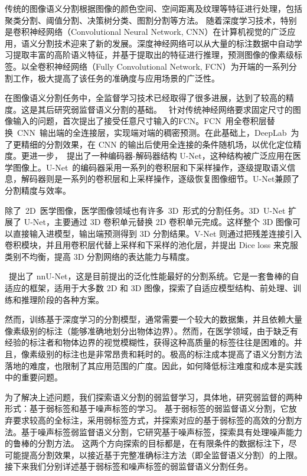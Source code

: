 传统的图像语义分割根据图像的颜色空间、空间距离及纹理等特征进行处理，包括聚类分割\citep{coates2012learning}、阈值分割\citep{ying2005fast}、决策树分类\citep{shotton2008semantic}、图割分割\citep{vicente2008graph}等方法。
随着深度学习技术，特别是卷积神经网络（Convolutional Neural Network, CNN）在计算机视觉的广泛应用，语义分割技术迎来了新的发展。深度神经网络可以从大量的标注数据中自动学习提取丰富的高阶语义特征，并基于提取出的特征进行推理，预测图像的像素级标签。以全卷积神经网络（Fully Convolutional Network, FCN）为开端的一系列分割工作，极大提高了该任务的准确度与应用场景的广泛性。

在图像语义分割任务中，全监督学习技术已经取得了很多进展，达到了较高的精度。这是其后研究弱监督语义分割的基础。
\citet{long2015fully}~针对传统神经网络要求固定尺寸的图像输入的问题，首次提出了接受任意尺寸输入的FCN。FCN~用全卷积层替换~CNN~输出端的全连接层，实现端对端的稠密预测。在此基础上，DeepLab~为了更精细的分割效果，在 CNN 的输出后使用全连接的条件随机场，以优化定位精度。更进一步，\citet{ronneberger2015u}~提出了一种编码器-解码器结构 U-Net，这种结构被广泛应用在医学图像上。U-Net~的编码器采用一系列的卷积层和下采样操作，逐级提取语义信息，解码器则是一系列的卷积层和上采样操作，逐级恢复图像细节。U-Net兼顾了分割精度与效率。

除了~2D~医学图像，医学图像领域也有许多~3D~形式的分割任务。3D~U-Net 扩展了 U-Net，主要通过 3D 卷积单元替换 2D 卷积单元完成。这样整个 3D 图像可以直接输入进模型，输出端预测得到 3D 分割结果。V-Net 则通过把残差连接引入卷积模块，并且用卷积层代替上采样和下采样的池化层，并提出 Dice loss 来克服类别不均衡，提高 3D 分割网络的表达能力与精度。

\citet{isensee2019automated}~提出了 nnU-Net，这是目前提出的泛化性能最好的分割系统。它是一套鲁棒的自适应的框架，适用于大多数 2D 和 3D 图像，探索了自适应模型结构、前处理、训练和推理阶段的各种方案。

然而，训练基于深度学习的分割模型，通常需要一个较大的数据集，并且依赖大量像素级别的标注（能够准确地划分出物体边界）。然而，在医学领域，由于缺乏有经验的标注者和物体边界的视觉模糊性，获得这种高质量的标签往往是困难的。并且，像素级别的标注也是非常昂贵和耗时的。极高的标注成本提高了语义分割方法落地的难度，也限制了其应用范围的广度。因此，如何降低标注难度和成本是实践中的重要问题。

为了解决上述问题，我们探索语义分割的弱监督学习，具体地，研究弱监督的两种形式：基于弱标签和基于噪声标签的学习。
基于弱标签的弱监督语义分割\citep{papandreou2015weakly,rajchl2016deepcut,cai2018accurate,ji2019scribble,kervadec2020bounding}，它放弃要求较高的全标注，采用弱标签方式，并探索对应的基于弱标签的高效的分割方法。基于噪声标签弱监督语义分割\citep{Zhu2019PickandLearnAQ,Xue2020CascadedRL,Zhang2020RobustMI}，它研究基于噪声标签，探索具有处理噪声能力的鲁棒的分割方法。
这两个方向探索的目标都是，在有限条件的数据标注下，尽可能提高分割效果，以接近基于完整准确标注方法（即全监督语义分割）的上限。
接下来我们分别详述基于弱标签和噪声标签的弱监督语义分割任务。

